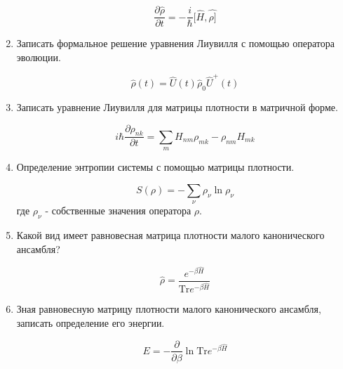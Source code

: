 \documentclass{article}
\begin{document}
\begin{enumerate}
	\begin{equation}
		\frac{\partial \hat{\rho}}{\partial t} = -\frac{i}{\hbar} [\hat{H}, \hat{\rho]}
	\end{equation}
	
	\item {Записать формальное решение уравнения Лиувилля с помощью оператора эволюции.}
	
	\begin{equation}
		\hat{\rho}(t) = \hat{U}(t)\hat{\rho}_0 \hat{U}^+(t)
	\end{equation}
	
	\item {Записать уравнение Лиувилля для матрицы плотности в матричной форме.}
	
	\begin{equation}
		i\hbar \frac{\partial \rho_{nk}}{\partial t} = \sum\limits_{m} H_{nm}\rho_{mk} - \rho_{nm}H_{mk}
	\end{equation}
	
	\item {Определение энтропии системы с помощью матрицы плотности.}
	
	\begin{equation}
		S(\rho) = -\sum\limits_{\nu} \rho_\nu \ln \rho_\nu
	\end{equation}
	где $\rho_\nu$ - собственные значения оператора $\rho$.
	
	\item {Какой вид имеет равновесная матрица плотности малого канонического ансамбля?}
	
	\begin{equation}
		\hat{\rho} = \frac{e^{-\beta\hat{H}}}{\text{Tr}e^{-\beta\hat{H}}}
	\end{equation}
	
	\item {Зная равновесную матрицу плотности малого канонического ансамбля, записать определение его энергии.}
	
	\begin{equation}
		E = - \frac{\partial}{\partial \beta} \ln \text{Tr}e^{-\beta\hat{H}}
	\end{equation}
\end{enumerate}
\end{document}
